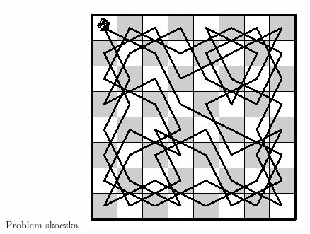 \begin{frame}{Problem skoczka}
    \centering
    \includegraphics[height=0.8\textheight]{recursion/graphics/knight_tour.jpg}
\end{frame}

